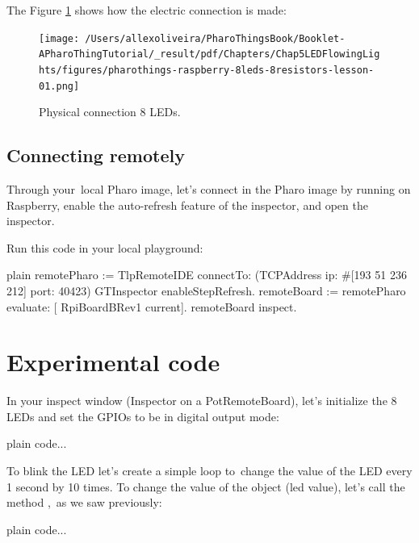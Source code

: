 \documentclass[10pt,twoside,english]{_support/latex/sbabook/sbabook}
\begin{document}
The Figure \ref{Physical8Leds} shows how the electric connection is made:


\begin{figure}

\begin{center}
\texttt{[image: /Users/allexoliveira/PharoThingsBook/Booklet-APharoThingTutorial/\_result/pdf/Chapters/Chap5LEDFlowingLights/figures/pharothings-raspberry-8leds-8resistors-lesson-01.png]}\caption{Physical connection 8 LEDs.\label{Physical8Leds}}\end{center}
\end{figure}

\subsection{Connecting remotely}
Through your local Pharo image, let's connect in the Pharo image by running on Raspberry, enable the auto-refresh feature of the inspector, and open the inspector.

Run this code in your local playground:

\begin{displaycode}{plain}
remotePharo := TlpRemoteIDE connectTo: (TCPAddress ip: #[193 51 236 212] port: 40423)
GTInspector enableStepRefresh.
remoteBoard := remotePharo evaluate: [ RpiBoardBRev1 current].
remoteBoard inspect.
\end{displaycode}
\section{Experimental code}
In your inspect window (Inspector on a PotRemoteBoard), let's initialize the 8 LEDs and set the GPIOs to be in digital output mode:

\begin{displaycode}{plain}
code...
\end{displaycode}

To blink the LED let's create a simple loop to change the value of the LED every 1 second by 10 times. To change the value of the object (led value), let's call the method , as we saw previously:

\begin{displaycode}{plain}
code...
\end{displaycode}


\backmatter

\end{document}
